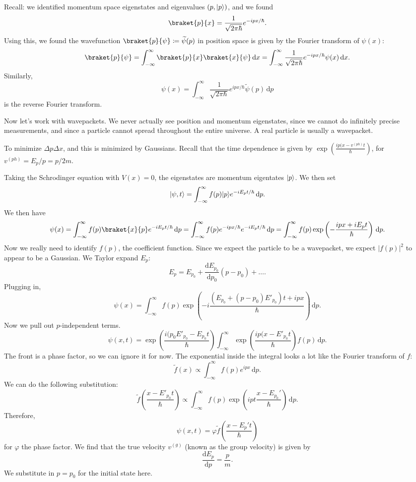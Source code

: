 Recall: we identified momentum space eigenstates and eigenvalues $(p,\lvert p\rangle )$, and we found
\[
	\braket{p}{x} =\frac{1}{\sqrt{2\pi \hbar } } e^{-ipx/\hbar } 
.\]
Using this, we found the wavefunction $\braket{p}{\psi } \coloneqq \widetilde{\psi }(p)$ in position space is given by the Fourier transform of $\psi (x)$:
\[
	\braket{p}{\psi } =\int_{-\infty }^{\infty } \braket{p }{x} \braket{x}{\psi }  \,\mathrm{d} x=\int_{-\infty }^{\infty } \frac{1}{\sqrt{2\pi \hbar } } e^{-ipx/\hbar } \psi (x) \,\mathrm{d} x
.\]
Similarly,
\[
	\psi(x)=\int_{-\infty }^{\infty } \frac{1}{\sqrt{2\pi \hbar } } e^{ipx/\hbar } \widetilde{\psi } \left( p \right)  \,\mathrm{d} p
\]
is the reverse Fourier transform.

Now let's work with wavepackets. We never actually see position and momentum eigenstates, since we cannot do infinitely precise measurements, and since a particle cannot spread throughout the entire universe. A real particle is usually a wavepacket.

To minimize $\Delta p\Delta x$, and this is minimized by Gaussians. Recall that the time dependence is given by $\exp \left( \frac{ip(x-v^{(ph)} t}{\hbar }  \right) $, for $v^{(ph)} =E_p/p=p/2m$.

Taking the Schrodinger equation with $V(x)=0$, the eigenstates are momentum eigentates $\lvert p\rangle $. We then set
\[
	\lvert\psi ,t \rangle =\int_{-\infty }^{\infty } f(p)\lvert p\rangle e^{-iE_pt/\hbar }  \,\mathrm{d} p
.\]
We then have
\[
	\psi (x)=\int_{-\infty }^{\infty } f(p)\braket{x}{p} e^{-iE_pt/\hbar }  \,\mathrm{d} p=\int_{-\infty }^{\infty } f(p)e^{-ipx/\hbar } e^{-iE_pt/\hbar }  \,\mathrm{d} p=\int_{-\infty }^{\infty } f(p)\exp \left( -\frac{ipx+iE_pt}{\hbar }  \right)  \,\mathrm{d} p
.\]
Now we really need to identify $f(p)$, the coefficient function. Since we expect the particle to be a wavepacket, we expect $\left| f(p) \right| ^2$ to appear to be a Gaussian. We Taylor expand $E_p$:
\[
	E_p=E_{p_0} +\frac{\mathrm{d}E_{p_0} }{\mathrm{d}p_0} (p-p_0)+\ldots 
.\]
Plugging in,
\[
	\psi (x)=\int_{-\infty }^{\infty } f(p)\exp \left( -i \frac{(E_{p_0} +(p-p_0)E'_{p_0} )t+ipx}{\hbar }  \right)  \,\mathrm{d} p
.\]
Now we pull out $p$-independent terms.
\[
	\psi (x,t)=\exp \left( \frac{i(p_0E'_{p_0} -E_{p_0} t}{\hbar }  \right) \int_{-\infty }^{\infty } \exp \left( \frac{ip(x-E'_{p_0} t}{\hbar }  \right) f(p) \,\mathrm{d} p
.\]
The front is a phase factor, so we can ignore it for now. The exponential inside the integral looks a lot like the Fourier transform of $f$:
\[
	\widetilde{f} (x)\propto \int_{-\infty }^{\infty } f(p)e^{ipx}  \,\mathrm{d} p
.\]
We can do the following substitution:
\[
	\widetilde{f} \left(\frac{x-E'_{p_0}t}{\hbar }\right)\propto\int_{-\infty }^{\infty } f(p)\exp \left( ipt\frac{x-E_{p_0} '}{\hbar }  \right)  \,\mathrm{d} p
.\]
Therefore,
\[
	\psi (x,t)=\varphi \widetilde{f} \left( \frac{x-E_{p} 't}{\hbar }  \right) 
\]
for $\varphi $ the phase factor. We find that the true velocity $v^{(g)} $ (known as the group velocity) is given by
\[
	\frac{\mathrm{d}E_p}{\mathrm{d}p} =\frac{p}{m} 
.\]
We substitute in $p=p_0$ for the initial state here.
